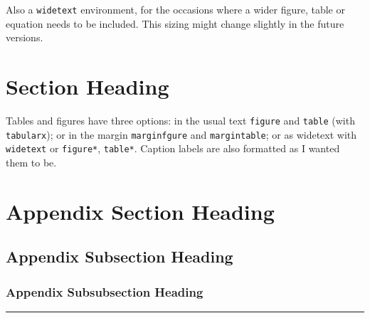 \documentclass[11pt]{salam}
\begin{document}
Also a \texttt{widetext} environment, for the occasions where a wider figure, table or equation needs to be included. This sizing might change slightly in the future versions.
\begin{widetext}
  \lipsum[33]
\end{widetext}



\section{Section Heading}
\lipsum[13]


Tables and figures have three options: in the usual text \texttt{figure} and \texttt{table} (with \texttt{tabularx}); or in the margin \texttt{marginfgure} and \texttt{margintable}; or as widetext with \texttt{widetext} or \texttt{figure*}, \texttt{table*}. Caption labels are also formatted as I wanted them to be.

\appendix
\section{Appendix Section Heading}
\lipsum[11]

\subsection{Appendix Subsection Heading}
\lipsum[12]

  \subsubsection{Appendix Subsubsection Heading}
  \lipsum[13]

\begin{center}
  \vspace*{1em}
  \rule{0.8\textwidth}{1pt}
\end{center}

\nocite{*}
{\small }
\end{document}
